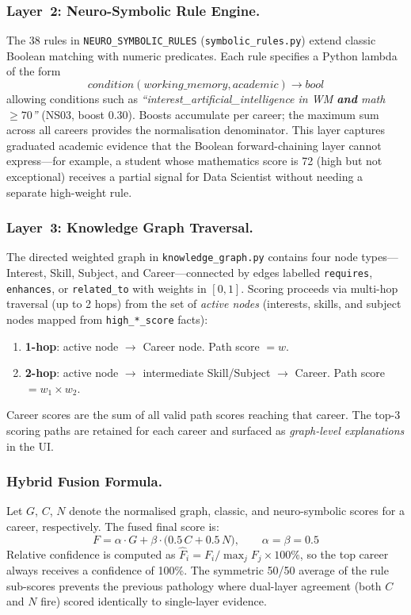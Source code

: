 \documentclass[runningheads]{llncs}
\begin{document}
\subsubsection{Layer~2: Neuro-Symbolic Rule Engine.}
\label{sec:ns-engine}
The 38 rules in \texttt{NEURO\_SYMBOLIC\_RULES} (\texttt{symbolic\_rules.py})
extend classic Boolean matching with numeric predicates.  Each rule specifies a
Python lambda of the form
\[
  \textit{condition}(\textit{working\_memory}, \textit{academic}) \to \textit{bool}
\]
allowing conditions such as
\textit{``interest\_artificial\_intelligence in WM \textbf{and} math $\geq 70$''}
(NS03, boost 0.30).  Boosts accumulate per career; the maximum sum across all
careers provides the normalisation denominator.
This layer captures graduated academic evidence that the Boolean forward-chaining
layer cannot express---for example, a student whose mathematics score is 72 (high
but not exceptional) receives a partial signal for Data Scientist without needing
a separate high-weight rule.

\subsubsection{Layer~3: Knowledge Graph Traversal.}
\label{sec:graph}
The directed weighted graph in \texttt{knowledge\_graph.py} contains four node
types---Interest, Skill, Subject, and Career---connected by edges labelled
\texttt{requires}, \texttt{enhances}, or \texttt{related\_to} with weights in
$[0,1]$.
Scoring proceeds via multi-hop traversal (up to 2 hops) from the set of
\emph{active nodes} (interests, skills, and subject nodes mapped from
\texttt{high\_*\_score} facts):
\begin{enumerate}
  \item \textbf{1-hop}: active node $\to$ Career node.  Path score $= w$.
  \item \textbf{2-hop}: active node $\to$ intermediate Skill/Subject $\to$ Career.
        Path score $= w_1 \times w_2$.
\end{enumerate}
Career scores are the sum of all valid path scores reaching that career.
The top-3 scoring paths are retained for each career and surfaced as
\emph{graph-level explanations} in the UI.

\subsubsection{Hybrid Fusion Formula.}
\label{sec:fusion}
Let $G$, $C$, $N$ denote the normalised graph, classic, and neuro-symbolic
scores for a career, respectively.  The fused final score is:
\begin{equation}
  F = \alpha \cdot G + \beta \cdot \bigl(0.5\,C + 0.5\,N\bigr),
  \qquad \alpha = \beta = 0.5
  \label{eq:fusion}
\end{equation}
Relative confidence is computed as $\hat{F}_i = F_i / \max_j F_j \times 100\%$,
so the top career always receives a confidence of 100\%.
The symmetric 50/50 average of the rule sub-scores prevents the previous
pathology where dual-layer agreement (both $C$ and $N$ fire) scored identically
to single-layer evidence.
\end{document}
